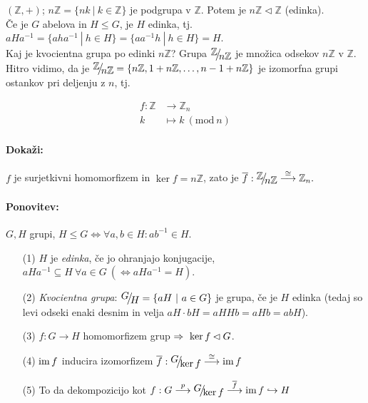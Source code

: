 \begin{zgled}
$(\mathbb{Z}, +)$; $n\mathbb{Z} = \{nk\ |\ k \in \mathbb{Z}\}$ je podgrupa v $\mathbb{Z}$. Potem je $n\mathbb{Z} \lhd \mathbb{Z}$ (edinka).\\[6pt]

 \v Ce je $G$ abelova in $H \leq G$, je $H$ edinka, tj. $aHa^{-1} = \{aha^{-1}\ |\ h \in H\} = \{aa^{-1}h\ |\ h\in H\} = H$.\\[6pt]

\ni Kaj je kvocientna grupa po edinki $n\mathbb{Z}$? Grupa $\quot{\mathbb{Z}}{n\mathbb{Z}}$ je mno\v zica odsekov $n\mathbb{Z}$ v $\mathbb{Z}$. Hitro vidimo,
da je $\quot{\mathbb{Z}}{n\mathbb{Z}} = \{n\mathbb{Z}, 1 + n\mathbb{Z}, \ldots, n - 1 + n\mathbb{Z}\}$ je izomorfna grupi ostankov pri deljenju z $n$, tj.

\begin{align*}
	f:\mathbb{Z} &\to \mathbb{Z}_n\\
	k &\mapsto k\ (\text{mod}\ n)
\end{align*}

\paragraph{Doka\v zi:} $f$ je surjetkivni homomorfizem in $\ker f = n\mathbb{Z}$, zato je $\overline{f}: \quot{\mathbb{Z}}{n\mathbb{Z}} \stackrel{\cong}{\longrightarrow} \mathbb{Z}_n.$
\end{zgled}

\paragraph{Ponovitev:}
$G, H$ grupi, $H \leq G \iff \forall a, b \in H: ab^{-1} \in H$.
\begin{itemize}
	\item[(1)]{$H$ je \emph{edinka}, \v ce jo ohranjajo konjugacije, $aHa^{-1} \subseteq H\ \forall a \in G\ 
		(\iff aHa^{-1} = H)$.}
	\item[(2)]{\emph{Kvocientna grupa}: $\quot{G}{H} = \{aH\ |\ a \in G\}$ je grupa, \v ce je $H$ edinka (tedaj so levi odseki enaki desnim in velja $aH \cdot bH = a HH b = a H b = ab H$).}
	\item[(3)]{$f : G \to H$ homomorfizem grup $\Rightarrow\ \ker f \lhd G$.}
	\item[(4)]{$\operatorname{im} f$ inducira izomorfizem $\overline{f} : \quot{G}{\ker f} \stackrel{\cong}{\longrightarrow} \im f$}
	\item[(5)]{To da dekompozicijo kot $f : G \stackrel{p}{\longrightarrow} \quot{G}{\ker f}\stackrel{\overline{f}}{\longrightarrow} \im f \hookrightarrow H$}
\end{itemize}

